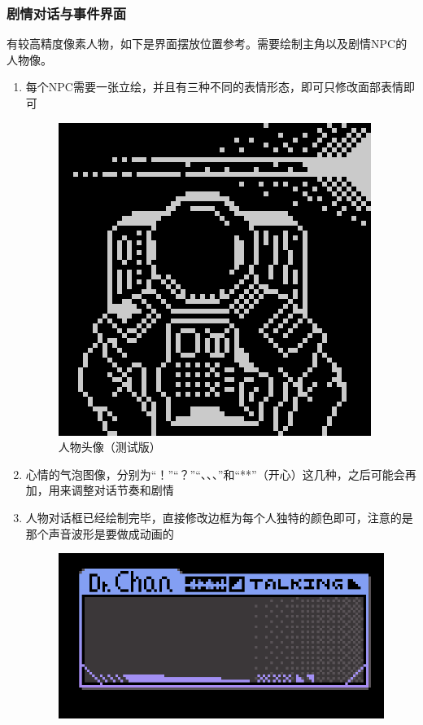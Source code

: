 \documentclass{ctexart}
\begin{document}
			\subsubsection{剧情对话与事件界面}
			有较高精度像素人物，如下是界面摆放位置参考。需要绘制主角以及剧情NPC的人物像。
			\begin{enumerate}
				\item 每个NPC需要一张立绘，并且有三种不同的表情形态，即可只修改面部表情即可
				
				\begin{figure}[H]
				\centering
				\includegraphics[scale=0.4]{material/宇航员.png}
				\caption{人物头像（测试版）}
				\label{人物头像}
				\end{figure}
				\item 心情的气泡图像，分别为“！”“？”“、、、”和“**”（开心）这几种，之后可能会再加，用来调整对话节奏和剧情
				\item 人物对话框已经绘制完毕，直接修改边框为每个人独特的颜色即可，注意的是那个声音波形是要做成动画的 
				\begin{figure}[H]
				\centering
				\includegraphics[scale=0.4]{material/hud3.png}

\end{figure}
\end{enumerate}
\end{document}
